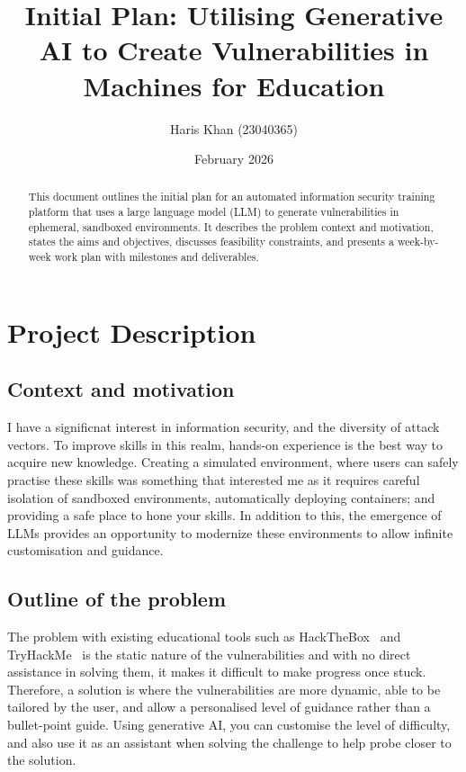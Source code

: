 \documentclass[serif,oneside,single,parskip,raggedright,numeric]{qproposal}
\title{Initial Plan: Utilising Generative AI to Create Vulnerabilities in Machines for Education}
\author{Haris Khan (23040365)}
\date{February 2026}
\begin{document}
\maketitle

\begin{abstract}
  This document outlines the initial plan for an automated information security training
  platform that uses a large language model (LLM) to generate vulnerabilities in ephemeral,
  sandboxed environments. It describes the problem context and motivation, states the aims
  and objectives, discusses feasibility constraints, and presents a week-by-week work plan
  with milestones and deliverables.
\end{abstract}

\section{Project Description}

\subsection*{Context and motivation}

I have a significnat interest in information security, and the diversity of attack vectors.
To improve skills in this realm, hands-on experience is the best way to acquire new knowledge.
Creating a simulated environment, where users can safely practise these skills was something
that interested me as it requires careful isolation of sandboxed environments, automatically
deploying containers; and providing a safe place to hone your skills. In addition to this,
the emergence of LLMs provides an opportunity to modernize these environments to allow
infinite customisation and guidance.

\subsection*{Outline of the problem}

The problem with existing educational tools such as HackTheBox~\citep{hackthebox} and
TryHackMe~\citep{tryhackme} is the static nature of the vulnerabilities and with no direct
assistance in solving them, it makes it difficult to make progress once stuck. Therefore, a
solution is where the vulnerabilities are more dynamic, able to be tailored by the user, and
allow a personalised level of guidance rather than a bullet-point guide. Using generative AI,
you can customise the level of difficulty, and also use it as an assistant when solving the
challenge to help probe closer to the solution.
\end{document}
